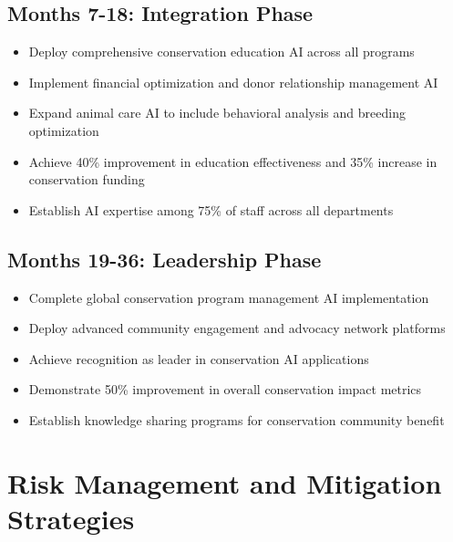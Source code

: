 \documentclass[
  Letterpaper,
]{scrbook}
\providecommand{\tightlist}{%
  \setlength{\itemsep}{0pt}\setlength{\parskip}{0pt}}
\begin{document}
\subsection*{Months 7-18: Integration
Phase}\label{months-7-18-integration-phase}

\begin{itemize}
\tightlist
\item
  Deploy comprehensive conservation education AI across all programs
\item
  Implement financial optimization and donor relationship management AI
\item
  Expand animal care AI to include behavioral analysis and breeding
  optimization
\item
  Achieve 40\% improvement in education effectiveness and 35\% increase
  in conservation funding
\item
  Establish AI expertise among 75\% of staff across all departments
\end{itemize}

\subsection*{Months 19-36: Leadership
Phase}\label{months-19-36-leadership-phase}

\begin{itemize}
\tightlist
\item
  Complete global conservation program management AI implementation
\item
  Deploy advanced community engagement and advocacy network platforms
\item
  Achieve recognition as leader in conservation AI applications
\item
  Demonstrate 50\% improvement in overall conservation impact metrics
\item
  Establish knowledge sharing programs for conservation community
  benefit
\end{itemize}

\section*{Risk Management and Mitigation
Strategies}\label{risk-management-and-mitigation-strategies}

\end{document}
